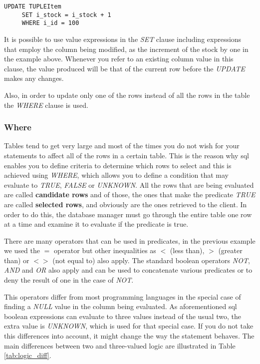 \begin{shaded}
\begin{lstlisting}
UPDATE TUPLEItem
     SET i_stock = i_stock + 1 
     WHERE i_id = 100
\end{lstlisting}  
\end{shaded}

It is possible to use value expressions in the \emph{SET} clause including expressions that employ the column being modified, as the increment of the stock by one in the example above. Whenever you refer to an existing column value in this clause, the value produced will be that of the current row before the \emph{UPDATE} makes any changes.

Also, in order to update only one of the rows instead of all the rows in the table the \emph{WHERE} clause is used.

\subsubsection{Where}
\label{sec:sql_where}

Tables tend to get very large and most of the times you do not wish for your statements to affect all of the rows in a certain table. This is the reason why \ac{sql} enables you to define criteria to determine which rows to select and this is achieved using \emph{WHERE}, which allows you to define a condition that may evaluate to \emph{TRUE}, \emph{FALSE} or \emph{UNKNOWN}. All the rows that are being evaluated are called \textbf{candidate rows} and of those, the ones that make the predicate \emph{TRUE} are called \textbf{selected rows}, and obviously are the ones retrieved to the client. In order to do this, the database manager must go through the entire table one row at a time and examine it to evaluate if the predicate is true.  

There are many operators that can be used in predicates, in the previous example we used the $=$ operator but other inequalities as $<$ (less than), $>$ (greater than) or $<>$ (not equal to) also apply. The standard boolean operators \emph{NOT}, \emph{AND} and \emph{OR} also apply and can be used to concatenate various predicates or to deny the result of one in the case of \emph{NOT}.

This operators differ from most programming languages in the special case of finding a \emph{NULL} value in the column being evaluated. As aforementioned \ac{sql} boolean expressions can evaluate to three values instead of the usual two, the extra value is \emph{UNKNOWN}, which is used for that special case. If you do not take this differences into account, it might change the way the statement behaves. The main differences between two and three-valued logic are illustrated in Table \ref{tab:logic_diff}.

